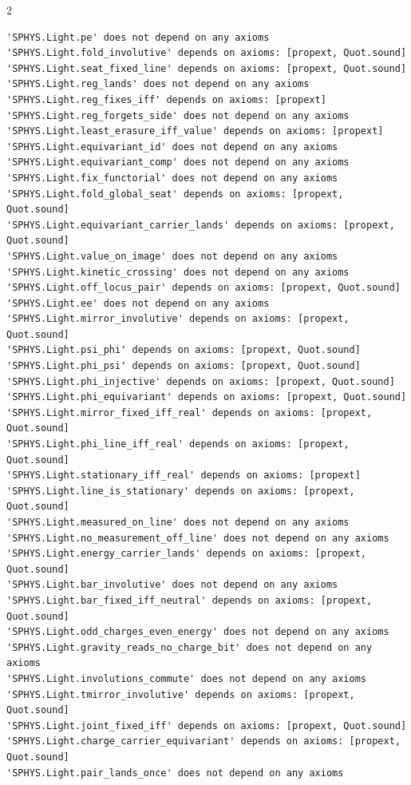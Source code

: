 \documentclass[10pt]{article}
\begin{document}
\begin{multicols}{2}
\begin{Verbatim}[fontsize=\fontsize{6.0}{6.9}\selectfont,breaklines,breakanywhere,breaksymbolleft={}]
'SPHYS.Light.pe' does not depend on any axioms
'SPHYS.Light.fold_involutive' depends on axioms: [propext, Quot.sound]
'SPHYS.Light.seat_fixed_line' depends on axioms: [propext, Quot.sound]
'SPHYS.Light.reg_lands' does not depend on any axioms
'SPHYS.Light.reg_fixes_iff' depends on axioms: [propext]
'SPHYS.Light.reg_forgets_side' does not depend on any axioms
'SPHYS.Light.least_erasure_iff_value' depends on axioms: [propext]
'SPHYS.Light.equivariant_id' does not depend on any axioms
'SPHYS.Light.equivariant_comp' does not depend on any axioms
'SPHYS.Light.fix_functorial' does not depend on any axioms
'SPHYS.Light.fold_global_seat' depends on axioms: [propext, Quot.sound]
'SPHYS.Light.equivariant_carrier_lands' depends on axioms: [propext, Quot.sound]
'SPHYS.Light.value_on_image' does not depend on any axioms
'SPHYS.Light.kinetic_crossing' does not depend on any axioms
'SPHYS.Light.off_locus_pair' depends on axioms: [propext, Quot.sound]
'SPHYS.Light.ee' does not depend on any axioms
'SPHYS.Light.mirror_involutive' depends on axioms: [propext, Quot.sound]
'SPHYS.Light.psi_phi' depends on axioms: [propext, Quot.sound]
'SPHYS.Light.phi_psi' depends on axioms: [propext, Quot.sound]
'SPHYS.Light.phi_injective' depends on axioms: [propext, Quot.sound]
'SPHYS.Light.phi_equivariant' depends on axioms: [propext, Quot.sound]
'SPHYS.Light.mirror_fixed_iff_real' depends on axioms: [propext, Quot.sound]
'SPHYS.Light.phi_line_iff_real' depends on axioms: [propext, Quot.sound]
'SPHYS.Light.stationary_iff_real' depends on axioms: [propext]
'SPHYS.Light.line_is_stationary' depends on axioms: [propext, Quot.sound]
'SPHYS.Light.measured_on_line' does not depend on any axioms
'SPHYS.Light.no_measurement_off_line' does not depend on any axioms
'SPHYS.Light.energy_carrier_lands' depends on axioms: [propext, Quot.sound]
'SPHYS.Light.bar_involutive' does not depend on any axioms
'SPHYS.Light.bar_fixed_iff_neutral' depends on axioms: [propext, Quot.sound]
'SPHYS.Light.odd_charges_even_energy' does not depend on any axioms
'SPHYS.Light.gravity_reads_no_charge_bit' does not depend on any axioms
'SPHYS.Light.involutions_commute' does not depend on any axioms
'SPHYS.Light.tmirror_involutive' depends on axioms: [propext, Quot.sound]
'SPHYS.Light.joint_fixed_iff' depends on axioms: [propext, Quot.sound]
'SPHYS.Light.charge_carrier_equivariant' depends on axioms: [propext, Quot.sound]
'SPHYS.Light.pair_lands_once' does not depend on any axioms

\end{Verbatim}
\end{multicols}
\end{document}
